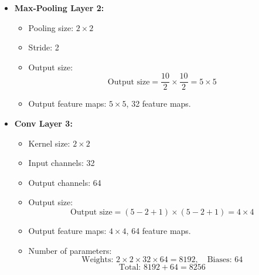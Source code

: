 \documentclass[a4paper,12pt]{article}
\begin{document}
\begin{itemize}
    \item \textbf{Max-Pooling Layer 2:}
    \begin{itemize}
        \item Pooling size: \( 2 \times 2 \)
        \item Stride: 2
        \item Output size:
        \[
        \text{Output size} = \frac{10}{2} \times \frac{10}{2} = 5 \times 5
        \]
        \item Output feature maps: \( 5 \times 5 \), 32 feature maps.
    \end{itemize}

    \item \textbf{Conv Layer 3:}
    \begin{itemize}
        \item Kernel size: \( 2 \times 2 \)
        \item Input channels: 32
        \item Output channels: 64
        \item Output size:
        \[
        \text{Output size} = (5 - 2 + 1) \times (5 - 2 + 1) = 4 \times 4
        \]
        \item Output feature maps: \( 4 \times 4 \), 64 feature maps.
        \item Number of parameters:
        \[
        \text{Weights: } 2 \times 2 \times 32 \times 64 = 8192, \quad \text{Biases: } 64
        \]
        \[
        \text{Total: } 8192 + 64 = 8256
        \]
    \end{itemize}
\end{itemize}
\end{document}
